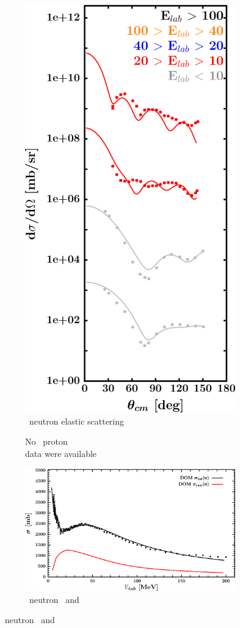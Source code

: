 \begin{figure}[hbtp]
\begin{subfigure}[c]{0.39\textheight}
        \includegraphics[width=0.52\linewidth]{figures/ca48_neutronElastic.png}
        \caption{\caEight\ neutron elastic scattering}
        \label{DOMFitData_ca48_neutron_elastic}
    \end{subfigure}\vspace{0.70in}
    \begin{subfigure}[c]{0.45\textwidth}
        \centering
        \caption{No \caEight\ proton \rxn\\ data were available}
        \label{DOMFitData_ca48_proton_inelastic}
    \end{subfigure}\hspace{6pt}
    \begin{subfigure}[c]{0.45\textwidth}
        \centering
        \includegraphics[width=\linewidth]{figures/ca48_neutronInelastic.png}
        \caption{\caEight\ neutron \rxn\ and \tot}
        \label{DOMFitData_ca48_neutron_inelastic}
    \end{subfigure}
\end{figure}
